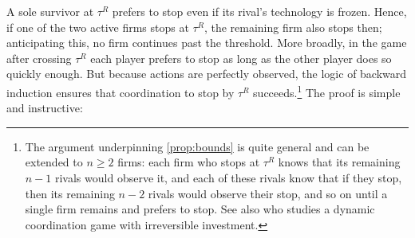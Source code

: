 \documentclass[12pt,reqno]{article}
\theoremstyle{definition} \newtheorem{example}{Example}
\theoremstyle{definition} \newtheorem{condition}{Condition}
\theoremstyle{definition} \newtheorem{corollary}{Corollary}
\theoremstyle{definition} \newtheorem{claim}{Claim}
\theoremstyle{definition} \newtheorem{definition}{Definition}
\theoremstyle{definition} \newtheorem{conjecture}{Conjecture}
\theoremstyle{definition} \newtheorem{Lemma}{Lemma}
\theoremstyle{definition} \newtheorem{lemma}{Lemma}
\theoremstyle{plain} \newtheorem{theorem}{Theorem}
\theoremstyle{definition} \newtheorem{assumption}{Assumption}
\theoremstyle{definition} \newtheorem*{assumptionnonumber}{Assumption}
\theoremstyle{definition} \newtheorem*{theoremNoNumber}{Proposition}
\theoremstyle{definition}
\theoremstyle{definition}\newtheorem{proposition}{Proposition}
\theoremstyle{definition} \newtheorem{result}{Result}
\theoremstyle{definition} \newtheorem*{definitionNoNumber}{Definition}
\theoremstyle{definition} \newtheorem{Definition}{Definition}
\theoremstyle{definition} \newtheorem*{DefinitionNoNumber}{Definition}
\theoremstyle{definition} \newtheorem*{fact}{Fact}
\theoremstyle{definition} \newtheorem*{property}{Property}
\theoremstyle{definition} \newtheorem{remark}{Remark}
\begin{document}
A sole survivor at $\tau^R$ prefers to stop even if its rival's technology is frozen. Hence, if one of the two active firms stops at $\tau^R$, the remaining firm also stops then; anticipating this, no firm continues past the threshold. More broadly, in the game after crossing $\tau^R$ each player prefers to stop as long as the other player does so quickly enough. But because actions are perfectly observed, the logic of backward induction ensures that coordination to stop by $\tau^R$ succeeds.\footnote{The argument underpinning \cref{prop:bounds} is quite general and can be extended to $n \geq 2$ firms: each firm who stops at $\tau^R$ knows that its remaining $n - 1$ rivals would observe it, and each of these rivals know that if they stop, then its remaining $n-2$ rivals would observe their stop, and so on until a single firm remains and prefers to stop. See also \cite{gale1995dynamic} who studies a dynamic coordination game with irreversible investment.} The proof is simple and instructive: 
\end{document}
